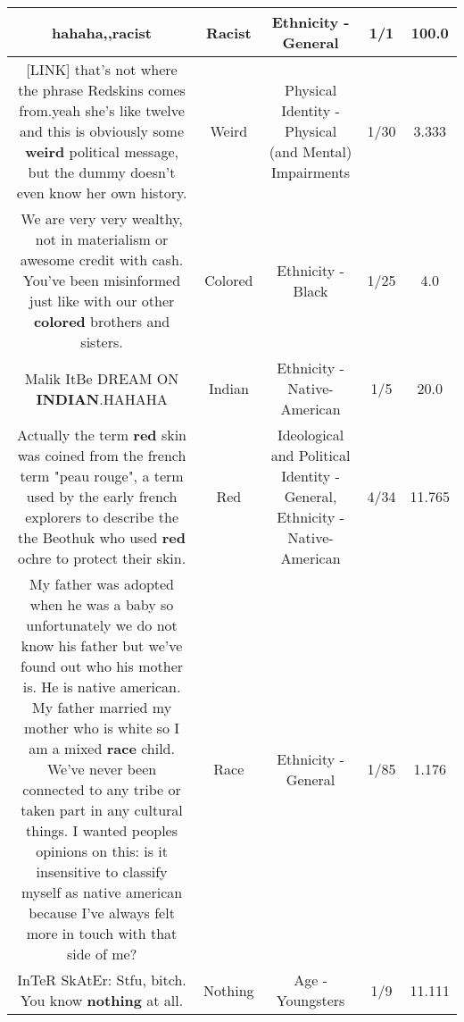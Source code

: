 \documentclass[11pt]{article}
\newlength\mylength
\begin{document}
\begin{center}
\begin{longtable}{|C{.65\mylength}|C{.30\mylength}|C{.12\mylength}|C{.12\mylength}|C{.12\mylength}|}
  \small hahaha,,racist\normalsize   & Racist & Ethnicity - General & 1/1 & 100.0 \\  \hline
  \small  [LINK] that's not where the phrase Redskins comes from.yeah she's like twelve and this is obviously some \textbf{weird} political message, but the dummy doesn't even know her own history.\normalsize   & Weird & Physical Identity - Physical (and Mental) Impairments & 1/30 & 3.333 \\  \hline
  \small We are very very wealthy, not in materialism or awesome credit with cash. You've been misinformed just like with our other \textbf{colored} brothers and sisters.\normalsize   & Colored & Ethnicity - Black & 1/25 & 4.0 \\  \hline
  \small Malik ItBe DREAM ON \textbf{INDIAN}.HAHAHA\normalsize   & Indian & Ethnicity - Native-American & 1/5 & 20.0 \\  \hline
  \small Actually the term \textbf{r\textbf{ed}} skin was coined from the french term "peau rouge", a term used by the early french explorers to describe the the Beothuk who used \textbf{r\textbf{ed}} ochre  to protect their skin.\normalsize   & Red &  Ideological and Political Identity - General, Ethnicity - Native-American & 4/34 & 11.765 \\  \hline
  \small My father was adopted when he was a baby so unfortunately we do not know his father but we've found out who his mother is. He is native american. My father married my mother who is white so I am a mixed \textbf{race} child. We've never been connected to any tribe or taken part in any cultural things. I wanted peoples opinions on this: is it insensitive to classify myself as native american because I've always felt more in touch with that side of me?\normalsize   & Race & Ethnicity - General & 1/85 & 1.176 \\  \hline
  \small InTeR SkAtEr: Stfu, bitch. You know \textbf{nothing} at all.\normalsize   & Nothing & Age - Youngsters & 1/9 & 11.111 \\  \hline

\end{longtable}
\end{center}
\end{document}
